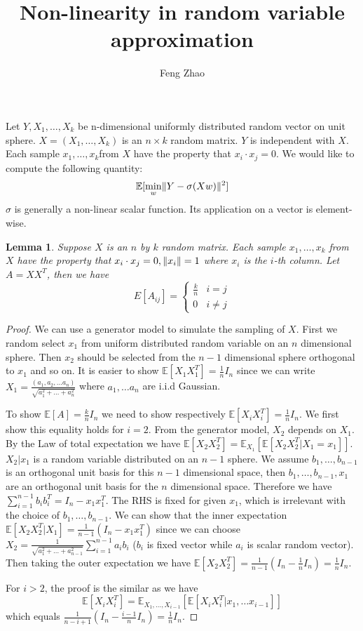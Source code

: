 \documentclass{article}
\title{Non-linearity in random variable approximation}
\author{Feng Zhao}
\DeclarePairedDelimiter\norm{\lVert}{\rVert}
\def\E{\mathbb{E}}
\newtheorem{lemma}{Lemma}
\begin{document}
\maketitle
Let $Y, X_1, \dots, X_k$ be n-dimensional uniformly distributed random vector on unit sphere. $X=(X_1, \dots, X_k)$ is an $n\times k$ random matrix. $Y$ is independent with $X$. Each sample $x_1, \dots, x_k$from $X$ have the property that $x_i \cdot x_j = 0$. We would like to compute the following quantity:
\begin{equation}\label{eq:Eminw}
\E[\min_w \norm{Y - \sigma (X w ) }^2]
\end{equation}
$\sigma$ is generally a non-linear scalar function. Its application on a vector is element-wise.
\begin{lemma}
Suppose $X$ is an $n$ by $k$ random matrix. Each sample $x_1, \dots, x_k$ from $X$ have the property that $x_i \cdot x_j = 0, \norm{x_i}=1$ where $x_i$ is the $i$-th column.  Let $A=X X^T$, then we have
\begin{equation}
E[A_{ij}]= \begin{cases}
\frac{k}{n} & i = j\\
0 & i\neq j 
\end{cases}
\end{equation}
\end{lemma}
\begin{proof}
We can use a generator model to simulate the sampling of $X$. First we random select $x_1$ from uniform distributed random variable on an $n$ dimensional sphere. Then $x_2$ should be selected from the $n-1$ dimensional sphere orthogonal to $x_1$ and so on.
It is easier to show $\E[X_1X_1^T] = \frac{1}{n} I_n$ since we can write $X_1 = \frac{(a_1, a_2, \dots a_n) }{\sqrt{a_1^2+\dots + a_n^2}}$ where $a_1, \dots a_n$ are i.i.d Gaussian.

To show $\E[A]=\frac{k}{n}I_n$ we need to show respectively $\E[X_iX_i^T]=\frac{1}{n} I_n$. We first show this equality holds for $i=2$. From the generator model, $X_2$ depends on $X_1$. By the Law of total expectation we have $\E[X_2 X_2^T] = \E_{X_1}[\E[X_2 X_2^T |X_1 = x_1]]$. $X_2 | x_1$ is a random variable distributed on an $n-1$ sphere. We assume $b_1, \dots, b_{n-1}$ is an orthogonal unit basis for this $n-1$ dimensional space,
then $b_1, \dots, b_{n-1}, x_1$ are an orthogonal unit basis for the $n$ dimensional space. Therefore we have
$\sum_{i=1}^{n-1} b_i b_i^T = I_n -  x_1 x_1^T $. The RHS is fixed for given $x_1$, which is irrelevant with the choice of $b_1, \dots, b_{n-1}$. We can show that the inner expectation $\E[X_2 X_2^T |X_1] = \frac{1}{n-1}(I_n - x_1 x_1^T)$ since we can choose $X_2 = \frac{1}{\sqrt{a_1^2 + \dots + a_{n-1}^2}} \sum_{i=1}^{n-1} a_i b_i$ ($b_i$ is fixed vector while $a_i$ is scalar random vector). Then taking the outer expectation we have $\E[X_2 X_2^T] = \frac{1}{n-1} (I_n - \frac{1}{n} I_n) = \frac{1}{n} I_n$.

For $i>2$, the proof is the similar as we have $$
\E[X_i X_i^T] = \E_{X_1, \dots, X_{i-1}} [\E[X_i X_i^T | x_1, \dots x_{i-1}]]
$$
 which equals $\frac{1}{n-i+1}(I_n - \frac{i-1}{n} I_n) = \frac{1}{n} I_n$.
\end{proof}
\end{document}
